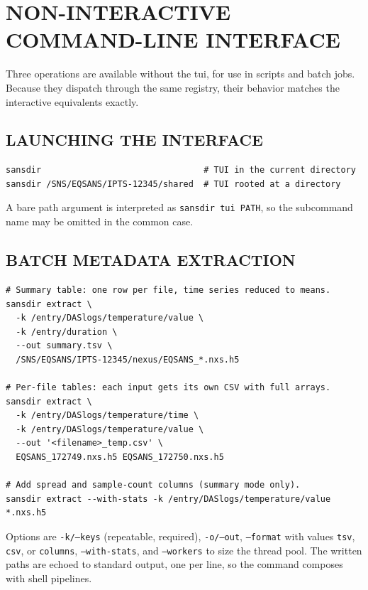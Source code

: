 \documentclass[tm]{ornltm}
\begin{document}
\section{NON-INTERACTIVE COMMAND-LINE INTERFACE}
\label{sec:cli}

Three operations are available without the \ac{tui}, for use in scripts and
batch jobs. Because they dispatch through the same registry, their behavior
matches the interactive equivalents exactly.

\subsection{LAUNCHING THE INTERFACE}

\begin{lstlisting}[language=shellsession]
sansdir                                # TUI in the current directory
sansdir /SNS/EQSANS/IPTS-12345/shared  # TUI rooted at a directory
\end{lstlisting}

A bare path argument is interpreted as \texttt{sansdir tui PATH}, so the
subcommand name may be omitted in the common case.

\subsection{BATCH METADATA EXTRACTION}

\begin{lstlisting}[language=shellsession]
# Summary table: one row per file, time series reduced to means.
sansdir extract \
  -k /entry/DASlogs/temperature/value \
  -k /entry/duration \
  --out summary.tsv \
  /SNS/EQSANS/IPTS-12345/nexus/EQSANS_*.nxs.h5

# Per-file tables: each input gets its own CSV with full arrays.
sansdir extract \
  -k /entry/DASlogs/temperature/time \
  -k /entry/DASlogs/temperature/value \
  --out '<filename>_temp.csv' \
  EQSANS_172749.nxs.h5 EQSANS_172750.nxs.h5

# Add spread and sample-count columns (summary mode only).
sansdir extract --with-stats -k /entry/DASlogs/temperature/value *.nxs.h5
\end{lstlisting}

Options are \texttt{-k/--keys} (repeatable, required), \texttt{-o/--out},
\texttt{--format} with values \texttt{tsv}, \texttt{csv}, or \texttt{columns},
\texttt{--with-stats}, and \texttt{--workers} to size the thread pool. The
written paths are echoed to standard output, one per line, so the command
composes with shell pipelines.
\end{document}
